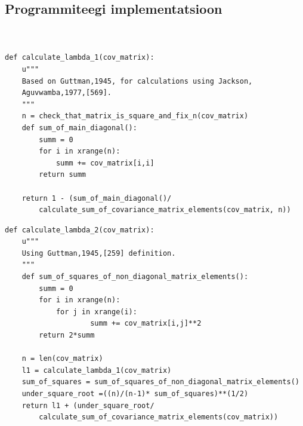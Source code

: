 \documentclass[a4paper,12pt,oneside]{article}
\newenvironment{customFloatWrap}{}{}
\numberwithin{equation}{section}
\theoremstyle{definition}
\begin{document}
\begin{subappendices}
\makeatletter
\newpage
\pagestyle{empty}

\subsection{Programmiteegi implementatsioon}
\label{appendix:code}


\begin{customFloatWrap}
\begin{verbatim}


def calculate_lambda_1(cov_matrix):
    u""" 
    Based on Guttman,1945, for calculations using Jackson,
    Aguvwamba,1977,[569].
    """
    n = check_that_matrix_is_square_and_fix_n(cov_matrix)
    def sum_of_main_diagonal():
        summ = 0
        for i in xrange(n):
            summ += cov_matrix[i,i]
        return summ

    return 1 - (sum_of_main_diagonal()/
    	calculate_sum_of_covariance_matrix_elements(cov_matrix, n))

\end{verbatim}
\end{customFloatWrap}

\vspace{10pt}


\begin{customFloatWrap}
\begin{verbatim}
def calculate_lambda_2(cov_matrix):
    u"""
    Using Guttman,1945,[259] definition.
    """
    def sum_of_squares_of_non_diagonal_matrix_elements():
        summ = 0
        for i in xrange(n):
            for j in xrange(i):
                    summ += cov_matrix[i,j]**2 
        return 2*summ
    
    n = len(cov_matrix)
    l1 = calculate_lambda_1(cov_matrix)
    sum_of_squares = sum_of_squares_of_non_diagonal_matrix_elements()
    under_square_root =((n)/(n-1)* sum_of_squares)**(1/2)
    return l1 + (under_square_root/
        calculate_sum_of_covariance_matrix_elements(cov_matrix))
\end{verbatim}
\end{customFloatWrap}


\vspace{10pt}


\end{subappendices}
\end{document}
